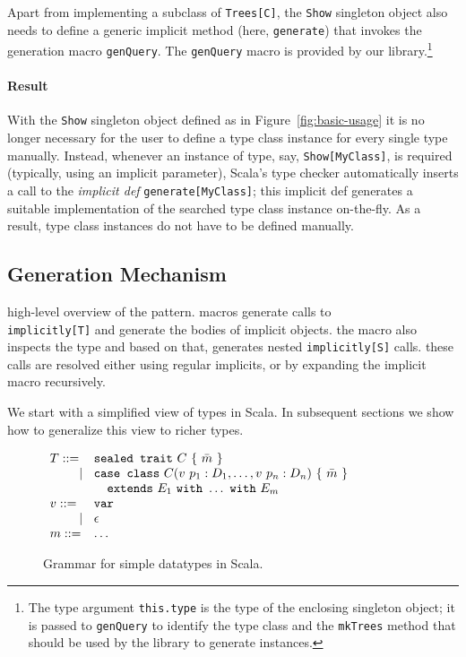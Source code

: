 \documentclass[preprint]{sigplanconf}
\newcommand{\gap}{\quad\quad}
\newcommand{\ba}{\begin{array}}
\newcommand{\ea}{\end{array}}
\begin{document}
Apart from implementing a subclass of \verb|Trees[C]|, the \verb|Show|
singleton object also needs to define a generic implicit method (here,
\verb|generate|) that invokes the generation macro \verb|genQuery|. The
\verb|genQuery| macro is provided by our library.\footnote{The type argument
\texttt{this.type} is the type of the enclosing singleton object; it is passed
to \texttt{genQuery} to identify the type class and the \texttt{mkTrees}
method that should be used by the library to generate instances.}

\paragraph{Result} With the \verb|Show| singleton object defined as in Figure~\ref{fig:basic-usage}
it is no longer necessary for the user to define a type class instance for every single type manually.
Instead, whenever an instance of type, say, \verb|Show[MyClass]|, is required
(typically, using an implicit parameter), Scala's type checker automatically inserts
a call to the \emph{implicit def} \verb|generate[MyClass]|; this implicit def generates a
suitable implementation of the searched type class instance on-the-fly. As a result,
type class instances do not have to be defined manually.

\subsection{Generation Mechanism}\label{sec:basic-generation}

high-level overview of the pattern. macros generate calls to \\\verb|implicitly[T]| and generate the bodies of implicit objects. the macro also inspects the type and based on that, generates nested \verb|implicitly[S]| calls. these calls are resolved either using regular implicits, or by expanding the implicit macro recursively.

We start with a simplified view of types in Scala. In subsequent sections we
show how to generalize this view to richer types.

\begin{figure}
  \centering
$\ba[t]{l@{\hspace{2mm}}l@{\hspace{2mm}}}
T    ::= & \texttt{sealed trait}~C~\{~\bar{m}~\} \\
\gap ~|~ & \texttt{case class}~C(v~p_1: D_1, \ldots, v~p_n: D_n)~\{~\bar{m}~\} \\
\gap     & \texttt{~~extends}~E_1~\texttt{with}~ \ldots ~\texttt{with}~E_m \\
v    ::= & \texttt{var} \\
\gap ~|~ & \epsilon \\
m    ::= & \ldots \\
\ea$
  \caption{Grammar for simple datatypes in Scala.}
  \label{fig:type-syntax}
\end{figure}
\end{document}
